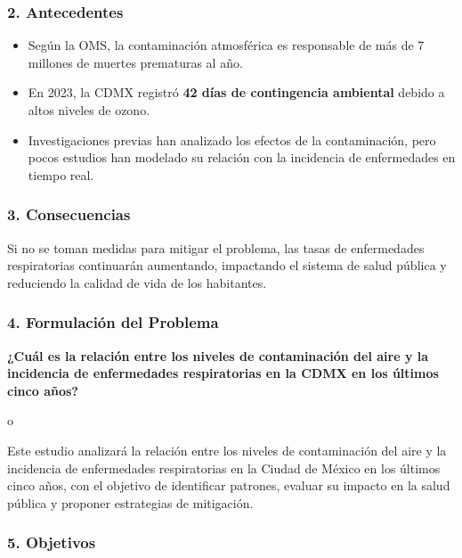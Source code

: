 \documentclass[
  letterpaper,
  DIV=11,
  numbers=noendperiod]{scrartcl}
\providecommand{\tightlist}{%
  \setlength{\itemsep}{0pt}\setlength{\parskip}{0pt}}
\begin{document}
\subsubsection{\texorpdfstring{\textbf{2.
Antecedentes}}{2. Antecedentes}}\label{antecedentes}

\begin{itemize}
\tightlist
\item
  Según la OMS, la contaminación atmosférica es responsable de más de 7
  millones de muertes prematuras al año.\\
\item
  En 2023, la CDMX registró \textbf{42 días de contingencia ambiental}
  debido a altos niveles de ozono.\\
\item
  Investigaciones previas han analizado los efectos de la contaminación,
  pero pocos estudios han modelado su relación con la incidencia de
  enfermedades en tiempo real.
\end{itemize}

\subsubsection{\texorpdfstring{\textbf{3.
Consecuencias}}{3. Consecuencias}}\label{consecuencias}

Si no se toman medidas para mitigar el problema, las tasas de
enfermedades respiratorias continuarán aumentando, impactando el sistema
de salud pública y reduciendo la calidad de vida de los habitantes.

\subsubsection{\texorpdfstring{\textbf{4. Formulación del
Problema}}{4. Formulación del Problema}}\label{formulaciuxf3n-del-problema}

\textbf{¿Cuál es la relación entre los niveles de contaminación del aire
y la incidencia de enfermedades respiratorias en la CDMX en los últimos
cinco años?}

o

Este estudio analizará la relación entre los niveles de contaminación
del aire y la incidencia de enfermedades respiratorias en la Ciudad de
México en los últimos cinco años, con el objetivo de identificar
patrones, evaluar su impacto en la salud pública y proponer estrategias
de mitigación.

\subsubsection{\texorpdfstring{\textbf{5.
Objetivos}}{5. Objetivos}}\label{objetivos}
\end{document}
